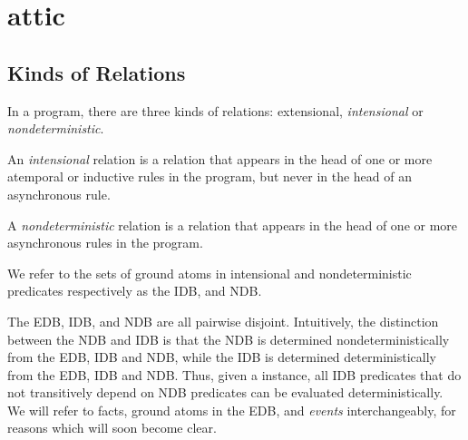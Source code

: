\section{attic}
\subsection{Kinds of Relations}

In a \lang program, there are three kinds of relations:
extensional, {\em intensional} or {\em nondeterministic}.

\begin{definition}
%
An \emph{intensional} relation is a relation that appears
in the head of one or more atemporal or inductive rules in the program, but
never in the head of an asynchronous rule.~
%
\end{definition}
\begin{definition}
%
A \emph{nondeterministic} relation is a relation that
appears in the head of one or more asynchronous rules in the program.
%
\end{definition}
We refer to the sets of ground atoms in intensional and nondeterministic
predicates respectively as the IDB, and NDB.

The EDB, IDB, and NDB are all pairwise disjoint.  Intuitively, the distinction
between the NDB and IDB is that the NDB is determined nondeterministically~ from
the EDB, IDB and NDB, while the IDB is determined deterministically from the
EDB, IDB and NDB.  Thus, given a \lang instance, all IDB predicates that do
not transitively depend on NDB predicates can be evaluated deterministically.
We will refer to facts, ground atoms in the EDB, and \emph{events}
interchangeably, for reasons which will soon become clear.

